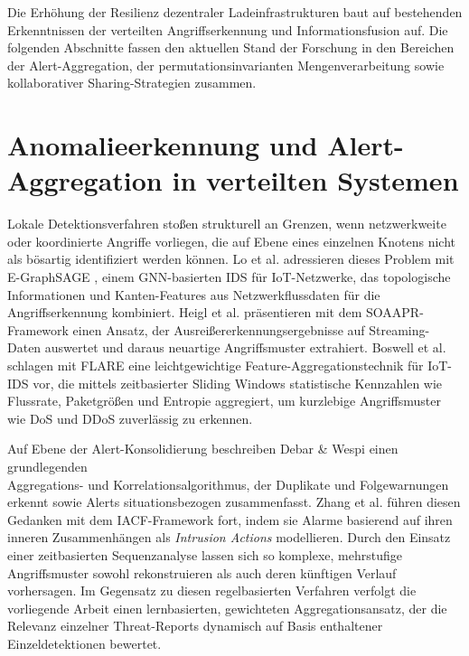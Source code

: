 Die Erhöhung der Resilienz dezentraler Ladeinfrastrukturen baut auf bestehenden Erkenntnissen der verteilten Angriffserkennung und Informationsfusion auf. Die folgenden Abschnitte fassen den aktuellen Stand der Forschung in den Bereichen der Alert-Aggregation, der permutationsinvarianten Mengenverarbeitung sowie kollaborativer Sharing-Strategien zusammen.

\section{Anomalieerkennung und Alert-Aggregation in verteilten Systemen}
Lokale Detektionsverfahren stoßen strukturell an Grenzen, wenn netzwerkweite oder koordinierte Angriffe vorliegen, die auf Ebene eines einzelnen Knotens nicht als bösartig identifiziert werden können. Lo et al. adressieren dieses Problem mit E-GraphSAGE \cite{lo2022egraphsage}, einem GNN-basierten IDS für IoT-Netzwerke, das topologische Informationen und Kanten-Features aus Netzwerkflussdaten für die Angriffserkennung kombiniert. Heigl et al. präsentieren mit dem SOAAPR-Framework \cite{heigl2021exploiting} einen Ansatz, der Ausreißererkennungsergebnisse auf Streaming-Daten auswertet und daraus neuartige Angriffsmuster extrahiert. Boswell et al. schlagen mit FLARE \cite{boswell2025flare} eine leichtgewichtige Feature-Aggregationstechnik für IoT-IDS vor, die mittels zeitbasierter Sliding Windows statistische Kennzahlen wie Flussrate, Paketgrößen und Entropie aggregiert, um kurzlebige Angriffsmuster wie DoS und DDoS zuverlässig zu erkennen.

Auf Ebene der Alert-Konsolidierung beschreiben Debar \& Wespi \cite{debar2001aggregation} einen grundlegenden\\Aggregations- und Korrelationsalgorithmus, der Duplikate und Folgewarnungen erkennt sowie Alerts situationsbezogen zusammenfasst. Zhang et al. \cite{zhang2019iacf} führen diesen Gedanken mit dem IACF-Framework fort, indem sie Alarme basierend auf ihren inneren Zusammenhängen als \textit{Intrusion Actions} modellieren. Durch den Einsatz einer zeitbasierten Sequenzanalyse lassen sich so komplexe, mehrstufige Angriffsmuster sowohl rekonstruieren als auch deren künftigen Verlauf vorhersagen. Im Gegensatz zu diesen regelbasierten Verfahren verfolgt die vorliegende Arbeit einen lernbasierten, gewichteten Aggregationsansatz, der die Relevanz einzelner Threat-Reports dynamisch auf Basis enthaltener Einzeldetektionen bewertet.

